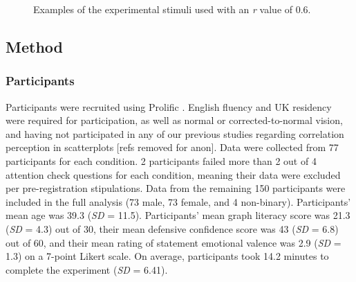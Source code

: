 \documentclass[manuscript,screen,review,anonymous]{acmart}
\begin{document}
\begin{figure}


\caption{\label{fig-main-examples}Examples of the experimental stimuli
used with an \textit{r} value of 0.6.}

\end{figure}%

\subsection{Method}\label{sec-method-main}

\subsubsection{Participants}\label{sec-participants-main}

Participants were recruited using Prolific \citep{prolific}. English
fluency and UK residency were required for participation, as well as
normal or corrected-to-normal vision, and having not participated in any
of our previous studies regarding correlation perception in scatterplots
{[}refs removed for anon{]}. Data were collected from 77 participants
for each condition. 2 participants failed more than 2 out of 4 attention
check questions for each condition, meaning their data were excluded per
pre-registration stipulations. Data from the remaining 150 participants
were included in the full analysis (73 male, 73 female, and 4
non-binary). Participants' mean age was 39.3 (\emph{SD} = 11.5).
Participants' mean graph literacy score was 21.3 (\emph{SD} = 4.3) out
of 30, their mean defensive confidence score was 43 (\emph{SD} = 6.8)
out of 60, and their mean rating of statement emotional valence was 2.9
(\emph{SD} = 1.3) on a 7-point Likert scale. On average, participants
took 14.2 minutes to complete the experiment (\emph{SD} = 6.41).
\end{document}

